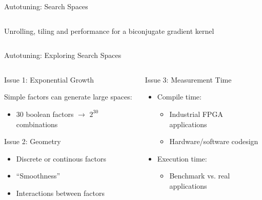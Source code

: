 \documentclass[10pt, compress, aspectratio=169, xcolor={table,usenames,dvipsnames}]{beamer}
\begin{document}
\begin{frame}[label={sec:org38c2757}]{Autotuning: Search Spaces}
\begin{columns}
\begin{column}{0.6\columnwidth}
\begin{center}
{\footnotesize
Unrolling, tiling and performance for a biconjugate gradient kernel
}
\end{center}
\end{column}
\end{columns}
\end{frame}

\begin{frame}[label={sec:org92b132d}]{Autotuning: Exploring Search Spaces}
\begin{columns}
\begin{column}{0.5\columnwidth}
\begin{block}{Issue 1: \alert{Exponential Growth}}
\vspace{.2cm}

Simple factors can generate large spaces:

\begin{itemize}
\item 30 boolean factors \(\rightarrow\) \(2^{30}\) combinations
\end{itemize}

\begin{block}{Issue 2: \alert{Geometry}}
\begin{itemize}
\item Discrete or continous factors
\item ``Smoothness''
\item Interactions between factors
\end{itemize}
\end{block}
\end{block}
\end{column}

\begin{column}{0.5\columnwidth}
\begin{block}{Issue 3: \alert{Measurement Time}}
\vspace{.2cm}

\begin{itemize}
\item Compile time:
\begin{itemize}
\item Industrial FPGA applications
\item Hardware/software codesign
\end{itemize}
\item Execution time:
\begin{itemize}
\item Benchmark vs. real applications
\end{itemize}
\end{itemize}
\end{block}
\end{column}
\end{columns}
\end{frame}
\end{document}
